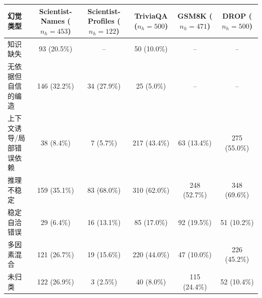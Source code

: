 \begin{tabular}{lccccc}
\toprule
幻觉类型 & Scientist-Names ($n_h=453$) & Scientist-Profiles ($n_h=122$) & TriviaQA ($n_h=500$) & GSM8K ($n_h=471$) & DROP ($n_h=500$) \\
\midrule
知识缺失 & 93 (20.5\%) & -- & 50 (10.0\%) & -- & -- \\
无依据但自信的编造 & 146 (32.2\%) & 34 (27.9\%) & 25 (5.0\%) & -- & -- \\
上下文诱导/局部错误依赖 & 38 (8.4\%) & 7 (5.7\%) & 217 (43.4\%) & 63 (13.4\%) & 275 (55.0\%) \\
推理不稳定 & 159 (35.1\%) & 83 (68.0\%) & 310 (62.0\%) & 248 (52.7\%) & 348 (69.6\%) \\
稳定自洽错误 & 29 (6.4\%) & 16 (13.1\%) & 85 (17.0\%) & 92 (19.5\%) & 51 (10.2\%) \\
多因素混合 & 121 (26.7\%) & 19 (15.6\%) & 220 (44.0\%) & 47 (10.0\%) & 226 (45.2\%) \\
未归类 & 122 (26.9\%) & 3 (2.5\%) & 40 (8.0\%) & 115 (24.4\%) & 52 (10.4\%) \\
\bottomrule
\end{tabular}

